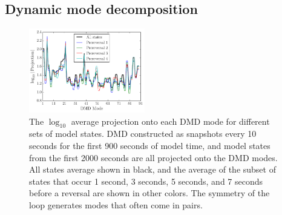 \subsection{Dynamic mode decomposition}

\begin{figure}[t]
  \centering
  \includegraphics[width=0.45\textwidth]{../2015-10-02-12-51-DMD_modes_pre_reversals.pdf}
  \caption[]{
    The $\log_{10}$ average projection onto each DMD mode for different sets of model states.
    DMD constructed as snapshots every 10 seconds for the first 900 seconds of model time, and model states from the first 2000 seconds are all projected onto the DMD modes.
    All states average shown in black, and the average of the subset of states that occur 1 second, 3 seconds, 5 seconds, and 7 seconds before a reversal are shown in other colors.
    The symmetry of the loop generates modes that often come in pairs.
      }
  \label{fig:DMD_modes}
\end{figure}



